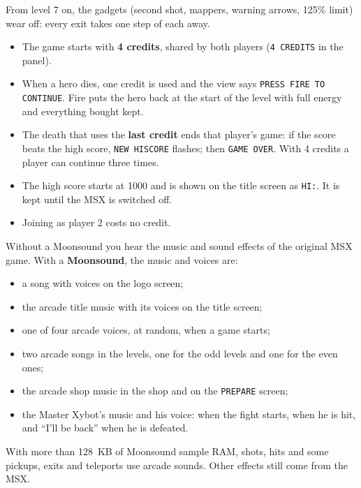 \medskip
From level 7 on, the gadgets (second shot, mappers, warning arrows, 125\% limit) wear off: every exit takes one step of each away.


\begin{itemize}
\item The game starts with \textbf{4 credits}, shared by both players (\texttt{4 CREDITS} in the panel).
\item When a hero dies, one credit is used and the view says \texttt{PRESS FIRE TO CONTINUE}. Fire puts the hero back at the start of
the level with full energy and everything bought kept.
\item The death that uses the \textbf{last credit} ends that player's game: if the score beats the high score, \texttt{NEW HISCORE}
flashes; then \texttt{GAME OVER}. With 4 credits a player can continue three times.
\item The high score starts at 1000 and is shown on the title screen as \texttt{HI:}. It is kept until the MSX is switched off.
\item Joining as player 2 costs no credit.
\end{itemize}


Without a Moonsound you hear the music and sound effects of the original MSX game. With a \textbf{Moonsound}, the music and voices are:

\begin{itemize}
\item a song with voices on the logo screen;
\item the arcade title music with its voices on the title screen;
\item one of four arcade voices, at random, when a game starts;
\item two arcade songs in the levels, one for the odd levels and one for the even ones;
\item the arcade shop music in the shop and on the \texttt{PREPARE} screen;
\item the Master Xybot's music and his voice: when the fight starts, when he is hit, and ``I'll be back'' when he is defeated.
\end{itemize}

With more than 128~KB of Moonsound sample RAM, shots, hits and some pickups, exits and teleports use arcade sounds. Other effects still come from the MSX.

